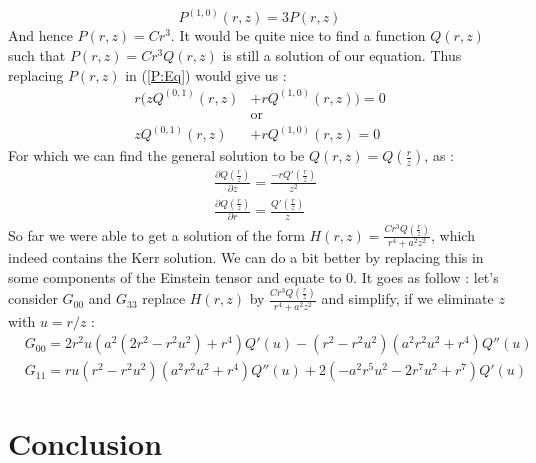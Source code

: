 \documentclass[a4paper,12pt]{article}
\theoremstyle{definition}
\begin{document}
\begin{equation}
	P^{(1,0)}(r,z)=3P(r,z)
\end{equation}
And hence $P(r,z)=Cr^3$. It would be quite nice to find a function $Q(r,z)$ such that $P(r,z)=Cr^3Q(r,z)$ is still a solution of our equation.
Thus replacing $P(r,z)$ in (\ref{P:Eq}) would give us :
\begin{align}
	r(z Q^{(0,1)}(r,z)&+r Q^{(1,0)}(r,z))=0\\
	&\text{or}\\
	z Q^{(0,1)}(r,z)&+r Q^{(1,0)}(r,z)=0
\end{align}
For which we can find the general solution to be $Q(r,z)=Q(\frac{r}{z})$, as :
\begin{align}
	&\frac{\partial Q(\frac{r}{z})}{\partial z}=\frac{-rQ'(\frac{r}{z})}{z^2}\\
	&\frac{\partial Q(\frac{r}{z})}{\partial r}= \frac{Q'(\frac{r}{z})}{z}
\end{align}
So far we were able to get a solution of the form $H(r,z)=\frac{Cr^3Q(\frac{r}{z})}{r^4+a^2z^2}$, which indeed contains the Kerr solution.
We can do a bit better by replacing this in some components of the Einstein tensor and equate to $0$.
It goes as follow : let's consider $G_{00}$ and $G_{33}$ replace $H(r,z)$ by $\frac{Cr^3Q(\frac{r}{z})}{r^4+a^2z^2}$ and simplify, if we eliminate $z$ with $u=r/z$ :
\begin{align}
	&G_{00}=2 r^2 u (a^2 (2 r^2-r^2 u^2)+r^4)Q'(u)-(r^2-r^2 u^2) (a^2 r^2u^2+r^4) Q''(u)\\
	&G_{11}=r u (r^2-r^2 u^2) (a^2 r^2u^2+r^4) Q''(u)+2 (-a^2 r^5 u^2-2r^7 u^2+r^7) Q'(u)
\end{align}

\section{Conclusion}
\end{document}
